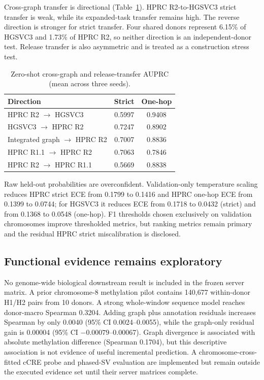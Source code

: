 \IfFileExists{ws-procs11x85.cls}{\worldscientificclasstrue\documentclass{ws-procs11x85}}{\worldscientificclassfalse\documentclass[11pt]{article}\usepackage[margin=1in]{geometry}}
\providecommand{\tbl}[2]{\caption{#1}#2}
\providecommand{\toprule}{\hline}
\providecommand{\colrule}{\hline}
\providecommand{\botrule}{\hline}
\begin{document}
Cross-graph transfer is directional (Table~\ref{tab:current_transfer}). HPRC
R2-to-HGSVC3 strict transfer is weak, while its expanded-task transfer remains
high. The reverse direction is stronger for strict transfer. Four shared donors
represent 6.15\% of HGSVC3 and 1.73\% of HPRC R2, so neither direction is an
independent-donor test. Release transfer is also asymmetric and is treated as a
construction stress test.

\begin{table}[t]
\tbl{Zero-shot cross-graph and release-transfer AUPRC (mean across three seeds).}
{\begin{tabular}{@{}lcc@{}}
\toprule
Direction & Strict & One-hop\\
\colrule
HPRC R2 $\rightarrow$ HGSVC3 & 0.5997 & 0.9408\\
HGSVC3 $\rightarrow$ HPRC R2 & 0.7247 & 0.8902\\
Integrated graph $\rightarrow$ HPRC R2 & 0.7007 & 0.8836\\
HPRC R1.1 $\rightarrow$ HPRC R2 & 0.7063 & 0.7846\\
HPRC R2 $\rightarrow$ HPRC R1.1 & 0.5669 & 0.8838\\
\botrule
\end{tabular}}
\label{tab:current_transfer}
\end{table}

Raw held-out probabilities are overconfident. Validation-only temperature
scaling reduces HPRC strict ECE from 0.1799 to 0.1416 and HPRC one-hop ECE from
0.1399 to 0.0744; for HGSVC3 it reduces ECE from 0.1718 to 0.0432 (strict) and
from 0.1368 to 0.0548 (one-hop). F1 thresholds chosen exclusively on validation
chromosomes improve thresholded metrics, but ranking metrics remain primary and
the residual HPRC strict miscalibration is disclosed.

\subsection{Functional evidence remains exploratory}

No genome-wide biological downstream result is included in the frozen server
matrix. A prior chromosome-8 methylation pilot contains 140{,}677 within-donor
H1/H2 pairs from 10 donors. A strong whole-window sequence model reaches
donor-macro Spearman 0.3204. Adding graph plus annotation residuals increases
Spearman by only 0.0040 (95\% CI 0.0024--0.0055), while the graph-only residual
gain is 0.00004 (95\% CI $-0.00079$--0.00067). Graph divergence is associated
with absolute methylation difference (Spearman 0.1704), but this descriptive
association is not evidence of useful incremental prediction. A
chromosome-cross-fitted cCRE probe and phased-SV evaluation are implemented but
remain outside the executed evidence set until their server matrices complete.
\end{document}
